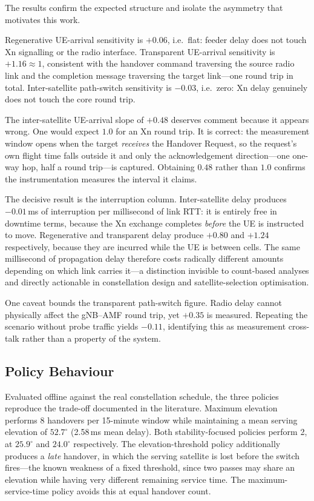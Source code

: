 \documentclass[conference]{IEEEtran}
\begin{document}
The results confirm the expected structure and isolate the asymmetry that
motivates this work.

Regenerative UE-arrival sensitivity is $+0.06$, i.e.\ flat: feeder delay does
not touch Xn signalling or the radio interface. Transparent UE-arrival
sensitivity is $+1.16 \approx 1$, consistent with the handover command
traversing the source radio link and the completion message traversing the
target link---one round trip in total. Inter-satellite path-switch sensitivity
is $-0.03$, i.e.\ zero: Xn delay genuinely does not touch the core round trip.

The inter-satellite UE-arrival slope of $+0.48$ deserves comment because it
appears wrong. One would expect $1.0$ for an Xn round trip. It is correct: the
measurement window opens when the target \emph{receives} the Handover Request,
so the request's own flight time falls outside it and only the acknowledgement
direction---one one-way hop, half a round trip---is captured. Obtaining $0.48$
rather than $1.0$ confirms the instrumentation measures the interval it claims.

The decisive result is the interruption column. Inter-satellite delay produces
$-0.01$\,ms of interruption per millisecond of link RTT: it is entirely free in
downtime terms, because the Xn exchange completes \emph{before} the UE is
instructed to move. Regenerative and transparent delay produce $+0.80$ and
$+1.24$ respectively, because they are incurred while the UE is between cells.
The same millisecond of propagation delay therefore costs radically different
amounts depending on which link carries it---a distinction invisible to
count-based analyses and directly actionable in constellation design and
satellite-selection optimisation.

One caveat bounds the transparent path-switch figure. Radio delay cannot
physically affect the gNB--AMF round trip, yet $+0.35$ is measured. Repeating
the scenario without probe traffic yields $-0.11$, identifying this as
measurement cross-talk rather than a property of the system.

\subsection{Policy Behaviour}

Evaluated offline against the real constellation schedule, the three policies
reproduce the trade-off documented in the literature. Maximum elevation performs
8 handovers per 15-minute window while maintaining a mean serving elevation of
$52.7^\circ$ (2.58\,ms mean delay). Both stability-focused policies perform 2,
at $25.9^\circ$ and $24.0^\circ$ respectively. The elevation-threshold policy
additionally produces a \emph{late} handover, in which the serving satellite is
lost before the switch fires---the known weakness of a fixed threshold, since
two passes may share an elevation while having very different remaining service
time. The maximum-service-time policy avoids this at equal handover count.
\end{document}
